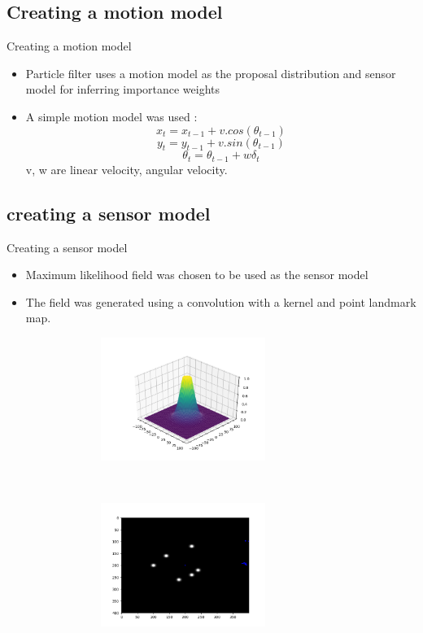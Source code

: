 \documentclass{beamer}
\begin{document}
\subsection{Creating a motion model}
\begin{frame}{Creating a motion model}
    \begin{itemize}
        \item Particle filter uses a motion model as the proposal distribution and sensor model for inferring importance weights 
        \item  A simple motion model was used :\\
            $$x_t = x_{t-1} + v.cos(\theta_{t-1})$$
            $$y_t = y_{t-1} + v.sin(\theta_{t-1})$$
            $$\theta _t = \theta _{t-1} + w \delta _{t}$$
        v, w are linear velocity, angular velocity. 
    \end{itemize}
\end{frame}

\subsection{creating a sensor model}
\begin{frame}{Creating a sensor model}
    \begin{itemize}

        \item Maximum likelihood field was chosen to be used as the sensor model 
        \item The field was generated using a convolution with a kernel and point landmark map.
\begin{figure}


     \centering
        \begin{subfigure}[b]{0.4\textwidth}
        \hspace*{-10mm}
        \includegraphics[height = 40mm,width = 60mm]{kernel.png}
        \end{subfigure}
    ~
        \begin{subfigure}[b]{0.4\textwidth}
        \centering
        \includegraphics[height = 40mm,width = 60mm]{ML field.png}
        \end{subfigure}
    \end{figure}   


    \end{itemize}
\end{frame}
\end{document}
